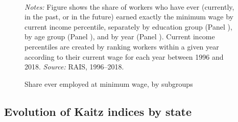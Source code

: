 \begin{figure}[!htb]
  \centering
  \caption{\label{fig:MW_share_ever_decomp_subgroups}Share ever employed at minimum wage, by subgroups}
  \prefigvspace
  \\
  \postfigvspace
  \begin{minipage}[t]{1\columnwidth}%
    \begin{spacing}{0.75}
      \emph{\scriptsize{}Notes: }{\scriptsize{}Figure shows the share of workers who have ever (currently, in the past, or in the future) earned exactly the minimum wage by current income percentile, separately by education group (Panel ), by age group (Panel ), and by year (Panel ). Current income percentiles are created by ranking workers within a given year according to their current wage for each year between 1996 and 2018. %
      \emph{\scriptsize{}Source: } RAIS, 1996--2018.}
    \end{spacing}
  \end{minipage}
\end{figure}




\clearpage
\subsection{Evolution of Kaitz indices by state\label{subsec:kaitz-evolution}}

